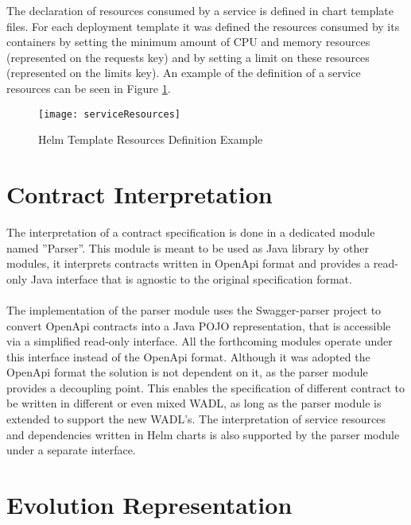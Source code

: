 \newpage

The declaration of resources consumed by a service is defined in chart template files.
For each deployment template it was defined the resources consumed by its containers by
setting the minimum amount of CPU and memory resources (represented on the requests key) and by setting a limit on these resources (represented on the limits key).
An example of the definition of a service resources can be seen in Figure \ref{fig:serviceResources}.

\begin{figure}[htbp]
    \centering
    \texttt{[image: serviceResources]}
    \caption{Helm Template Resources Definition Example}
    \label{fig:serviceResources}
\end{figure}

\section{Contract Interpretation} %
\label{sec:contract_interpretation}

The interpretation of a contract specification is done in a dedicated module named ''Parser''.
This module is meant to be used as Java library by other modules,
it interprets contracts written in OpenApi format and provides a read-only Java interface
that is agnostic to the original specification format.

\paragraph{}

The implementation of the parser module uses the Swagger-parser project \cite{swaggerparser} to convert OpenApi contracts into a Java POJO representation, that is accessible via a simplified read-only interface.
All the forthcoming modules operate under this interface instead of the OpenApi format.
Although it was adopted the OpenApi format the solution is not dependent on it, as the parser module provides a decoupling point.
This enables the specification of different contract to be written in different or even mixed WADL,
as long as the parser module is extended to support the new WADL's.
The interpretation of service resources and dependencies written in Helm charts is also supported by the parser module under a separate interface.

\newpage

\section{Evolution Representation} %
\label{sec:evolution_representation}

